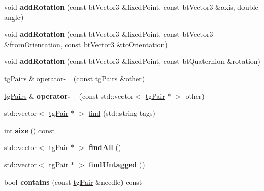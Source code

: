 \begin{DoxyCompactItemize}
\item 
\hypertarget{classtg_pairs_ac3a9f834fa9d07296b531f84c53ca1f8}{void {\bfseries add\-Rotation} (const bt\-Vector3 \&fixed\-Point, const bt\-Vector3 \&axis, double angle)}\label{classtg_pairs_ac3a9f834fa9d07296b531f84c53ca1f8}

\item 
\hypertarget{classtg_pairs_a3e632506fbd959c655fbb56d74fa2052}{void {\bfseries add\-Rotation} (const bt\-Vector3 \&fixed\-Point, const bt\-Vector3 \&from\-Orientation, const bt\-Vector3 \&to\-Orientation)}\label{classtg_pairs_a3e632506fbd959c655fbb56d74fa2052}

\item 
\hypertarget{classtg_pairs_aa158f17d03a9e78fc36d5fcb1d9cdf58}{void {\bfseries add\-Rotation} (const bt\-Vector3 \&fixed\-Point, const bt\-Quaternion \&rotation)}\label{classtg_pairs_aa158f17d03a9e78fc36d5fcb1d9cdf58}

\item 
\hyperlink{classtg_pairs}{tg\-Pairs} \& \hyperlink{classtg_pairs_a63ee2334a3a8ebb1b934162d27187e89}{operator-\/=} (const \hyperlink{classtg_pairs}{tg\-Pairs} \&other)
\item 
\hypertarget{classtg_pairs_a23fee512355212b18ad478f2864adbc0}{\hyperlink{classtg_pairs}{tg\-Pairs} \& {\bfseries operator-\/=} (const std\-::vector$<$ \hyperlink{classtg_pair}{tg\-Pair} $\ast$ $>$ other)}\label{classtg_pairs_a23fee512355212b18ad478f2864adbc0}

\item 
std\-::vector$<$ \hyperlink{classtg_pair}{tg\-Pair} $\ast$ $>$ \hyperlink{classtg_taggables_a233ca612e0279e5c1515bb8e13cc11f0}{find} (std\-::string tags)
\item 
\hypertarget{classtg_taggables_ae905e8ace08b8de004d1016e4ccb1ea0}{int {\bfseries size} () const}\label{classtg_taggables_ae905e8ace08b8de004d1016e4ccb1ea0}

\item 
\hypertarget{classtg_taggables_a3b72ad1ae319e1b4e9429765307962d4}{std\-::vector$<$ \hyperlink{classtg_pair}{tg\-Pair} $\ast$ $>$ {\bfseries find\-All} ()}\label{classtg_taggables_a3b72ad1ae319e1b4e9429765307962d4}

\item 
\hypertarget{classtg_taggables_a243be2dc97672c907030d33e9cb2b63f}{std\-::vector$<$ \hyperlink{classtg_pair}{tg\-Pair} $\ast$ $>$ {\bfseries find\-Untagged} ()}\label{classtg_taggables_a243be2dc97672c907030d33e9cb2b63f}

\item 
\hypertarget{classtg_taggables_a9a70a8d3c5a1a16f74b8850e83d7fbc2}{bool {\bfseries contains} (const \hyperlink{classtg_pair}{tg\-Pair} \&needle) const}\label{classtg_taggables_a9a70a8d3c5a1a16f74b8850e83d7fbc2}


\end{DoxyCompactItemize}
